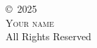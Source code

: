 \phantom{}\vspace{\fill}
\begin{center}
\copyright~2025\\
\textsc{Your name}\\
All Rights Reserved\\
\end{center}